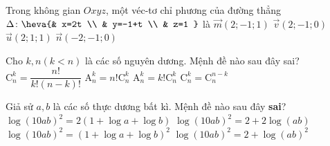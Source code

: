 \begin{ex}%
	Trong không gian $Oxyz$, một véc-tơ chỉ phương của đường thẳng $\Delta \colon \heva{& x=2t \\
	& y=-1+t \\
	& z=1 }$ là
	\choice
	{$\vec{m}\left(2;-1;1\right)$}
	{$\vec{v}\left(2;-1;0\right)$}
	{$\vec{u}\left(2;1;1\right)$}
	{\True $\vec{n}\left(-2;-1;0\right)$}
\end{ex}
\begin{ex}%
	Cho $k, n\left(k<n\right)$ là các số nguyên dương. Mệnh đề nào sau đây sai?
	\choice
	{$\mathrm{C}_n^k=\dfrac{{n!}}{{k!\left(n-k\right)!}}$}
	{\True $\mathrm{A}_n^k=n!\mathrm{C}_n^k$}
	{$\mathrm{A}_n^k=k!\mathrm{C}_n^k$}
	{$\mathrm{C}_n^k=\mathrm{C}_n^{n-k}$}
\end{ex}
\begin{ex}%
	Giả sử $a, b$ là các số thực dương bất kì. Mệnh đề nào sau đây \textbf{sai}?
	\choice
	{$\log (10ab)^2=2\left(1+\log a+\log b\right)$}
	{$\log \left(10ab\right)^2=2+2\log \left(ab\right)$}
	{\True $\log (10ab)^2=\left(1+\log a+\log b\right)^2$}
	{$\log (10ab)^2=2+\log \left(ab\right)^2$}
\end{ex}
